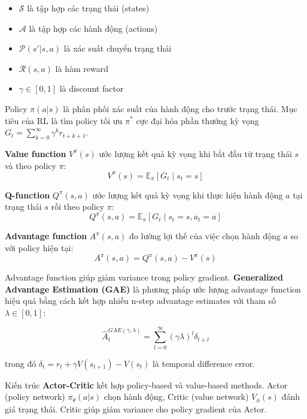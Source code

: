 \begin{itemize}
\item $\mathcal{S}$ là tập hợp các trạng thái (states)
\item $\mathcal{A}$ là tập hợp các hành động (actions)
\item $\mathcal{P}(s'|s,a)$ là xác suất chuyển trạng thái
\item $\mathcal{R}(s,a)$ là hàm reward
\item $\gamma \in [0,1]$ là discount factor
\end{itemize}

Policy $\pi(a|s)$ là phân phối xác suất của hành động cho trước trạng thái. Mục tiêu của RL là tìm policy tối ưu $\pi^*$ cực đại hóa phần thưởng kỳ vọng $G_t = \sum_{k=0}^{\infty} \gamma^k r_{t+k+1}$.

\textbf{Value function} $V^\pi(s)$ ước lượng kết quả kỳ vọng khi bắt đầu từ trạng thái $s$ và theo policy $\pi$:
\begin{equation}
V^\pi(s) = \mathbb{E}_\pi \left[ G_t \mid s_t = s \right]
\end{equation}

\textbf{Q-function} $Q^\pi(s,a)$ ước lượng kết quả kỳ vọng khi thực hiện hành động $a$ tại trạng thái $s$ rồi theo policy $\pi$:
\begin{equation}
Q^\pi(s,a) = \mathbb{E}_\pi \left[ G_t \mid s_t = s, a_t = a \right]
\end{equation}

\textbf{Advantage function} $A^\pi(s,a)$ đo lường lợi thế của việc chọn hành động $a$ so với policy hiện tại:
\begin{equation}
A^\pi(s,a) = Q^\pi(s,a) - V^\pi(s)
\end{equation}

Advantage function giúp giảm variance trong policy gradient. \textbf{Generalized Advantage Estimation (GAE)} \cite{schulman2015gae} là phương pháp ước lượng advantage function hiệu quả bằng cách kết hợp nhiều n-step advantage estimates với tham số $\lambda \in [0,1]$:

\begin{equation}
\hat{A}^{GAE(\gamma,\lambda)}_t = \sum_{l=0}^{\infty} (\gamma\lambda)^l \delta_{t+l}
\end{equation}

trong đó $\delta_t = r_t + \gamma V(s_{t+1}) - V(s_t)$ là temporal difference error.

Kiến trúc \textbf{Actor-Critic} kết hợp policy-based và value-based methods. Actor (policy network) $\pi_\theta(a|s)$ chọn hành động, Critic (value network) $V_\phi(s)$ đánh giá trạng thái. Critic giúp giảm variance cho policy gradient của Actor.

